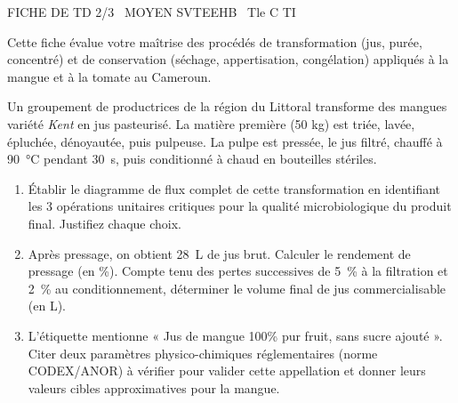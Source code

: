 \documentclass[11pt]{article}
\begin{document}
\begin{tcolorbox}[enhanced,colback=popink,colframe=popink,arc=10pt,boxrule=0pt,left=12pt,right=12pt,top=9pt,bottom=9pt]
{\color{white}\popxbold\small FICHE DE TD 2/3 \textbullet\ MOYEN \hfill SVTEEHB \textbullet\ Tle C TI\par}
\end{tcolorbox}
\vspace{4pt}
\noindent Cette fiche évalue votre maîtrise des procédés de transformation (jus, purée, concentré) et de conservation (séchage, appertisation, congélation) appliqués à la mangue et à la tomate au Cameroun.

\begin{exercice}
Un groupement de productrices de la région du Littoral transforme des mangues variété \textit{Kent} en jus pasteurisé. La matière première (50 kg) est triée, lavée, épluchée, dénoyautée, puis pulpeuse. La pulpe est pressée, le jus filtré, chauffé à \SI{90}{\celsius} pendant \SI{30}{\second}, puis conditionné à chaud en bouteilles stériles.
\begin{enumerate}
    \item Établir le diagramme de flux complet de cette transformation en identifiant les 3 opérations unitaires critiques pour la qualité microbiologique du produit final. Justifiez chaque choix.
    \item Après pressage, on obtient \SI{28}{\liter} de jus brut. Calculer le rendement de pressage (en \%). Compte tenu des pertes successives de \SI{5}{\%} à la filtration et \SI{2}{\%} au conditionnement, déterminer le volume final de jus commercialisable (en L).
    \item L'étiquette mentionne « Jus de mangue 100\% pur fruit, sans sucre ajouté ». Citer deux paramètres physico-chimiques réglementaires (norme CODEX/ANOR) à vérifier pour valider cette appellation et donner leurs valeurs cibles approximatives pour la mangue.
\end{enumerate}
\end{exercice}
\end{document}

